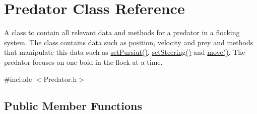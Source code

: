\hypertarget{classPredator}{
\section{Predator Class Reference}
\label{classPredator}
}


A class to contain all relevant data and methods for a predator in a flocking system. The class contains data such as position, velocity and prey and methods that manipulate this data such as \hyperlink{classPredator_a2e5d5f04490a8c579c1fc7e4b9886828}{setPursiut()}, \hyperlink{classPredator_a8f2a2bec2b92689dbd78a6081269e7cb}{setSteering()} and \hyperlink{classPredator_ac387f969b16cf3651b097f4470368683}{move()}. The predator focuses on one boid in the flock at a time.  


{\ttfamily \#include $<$Predator.h$>$}\subsection*{Public Member Functions}
